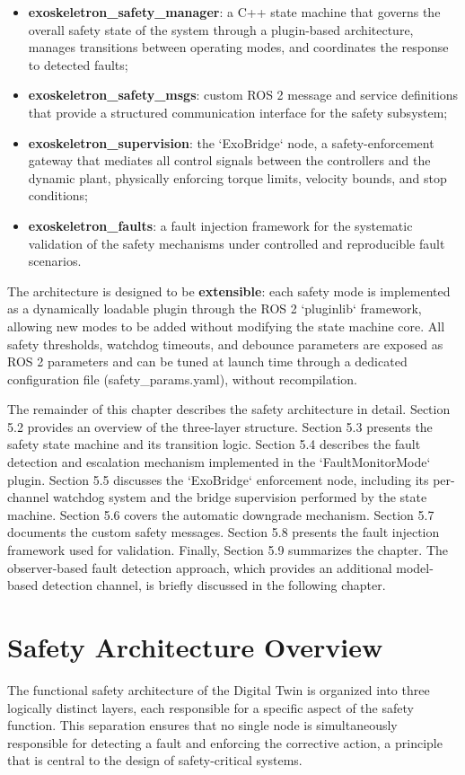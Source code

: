 \begin{itemize}
    \item \textbf{exoskeletron\_safety\_manager}: a C++ state machine that governs the overall safety state of the system through a plugin-based architecture, manages transitions between operating modes, and coordinates the response to detected faults;
    \item \textbf{exoskeletron\_safety\_msgs}: custom ROS 2 message and service definitions that provide a structured communication interface for the safety subsystem;
    \item \textbf{exoskeletron\_supervision}: the `ExoBridge` node, a safety-enforcement gateway that mediates all control signals between the controllers and the dynamic plant, physically enforcing torque limits, velocity bounds, and stop conditions;
    \item \textbf{exoskeletron\_faults}: a fault injection framework for the systematic validation of the safety mechanisms under controlled and reproducible fault scenarios.
\end{itemize}

The architecture is designed to be \textbf{extensible}: each safety mode is implemented as a dynamically loadable plugin through the ROS 2 `pluginlib` framework, allowing new modes to be added without modifying the state machine core. All safety thresholds, watchdog timeouts, and debounce parameters are exposed as ROS 2 parameters and can be tuned at launch time through a dedicated configuration file (safety\_params.yaml), without recompilation.

The remainder of this chapter describes the safety architecture in detail. Section 5.2 provides an overview of the three-layer structure. Section 5.3 presents the safety state machine and its transition logic. Section 5.4 describes the fault detection and escalation mechanism implemented in the `FaultMonitorMode` plugin. Section 5.5 discusses the `ExoBridge` enforcement node, including its per-channel watchdog system and the bridge supervision performed by the state machine. Section 5.6 covers the automatic downgrade mechanism. Section 5.7 documents the custom safety messages. Section 5.8 presents the fault injection framework used for validation. Finally, Section 5.9 summarizes the chapter. The observer-based fault detection approach, which provides an additional model-based detection channel, is briefly discussed in the following chapter.

\section{Safety Architecture Overview}
The functional safety architecture of the Digital Twin is organized into three logically distinct layers, each responsible for a specific aspect of the safety function. This separation ensures that no single node is simultaneously responsible for detecting a fault and enforcing the corrective action, a principle that is central to the design of safety-critical systems.

